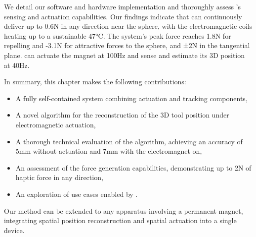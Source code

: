 We detail our software and hardware implementation and thoroughly assess \omniUIST's sensing and actuation capabilities. Our findings indicate that \omniUIST can continuously deliver up to 0.6N in any direction near the sphere, with the electromagnetic coils heating up to a sustainable 47°C. The system's peak force reaches 1.8N for repelling and -3.1N for attractive forces to the sphere, and ±2N in the tangential plane. \omniUIST can actuate the magnet at 100Hz and sense and estimate its 3D position at 40Hz.

In summary, this chapter makes the following contributions:
\begin{itemize}
\item A fully self-contained system combining actuation and tracking components,
\item A novel algorithm for the reconstruction of the 3D tool position under electromagnetic actuation,
\item A thorough technical evaluation of the algorithm, achieving an accuracy of 5mm without actuation and 7mm with the electromagnet on,
\item An assessment of the force generation capabilities, demonstrating up to 2N of haptic force in any direction,
\item An exploration of use cases enabled by \omniUIST.
\end{itemize}
Our method can be extended to any apparatus involving a permanent magnet, integrating spatial position reconstruction and spatial actuation into a single device.
